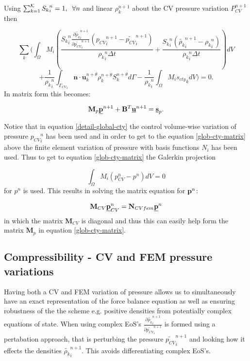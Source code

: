 Using $\sum_{k=1}^{\cal K} {S_k}_i^n =1, \;\; \forall n$ and linear 
$\rho_k^{n+1}$ about the CV pressure variation $P_{CV}^{n+1}$ then 

\begin{equation}
 \sum_k ( \int_{\Omega} M_i 
( \frac{{S_k}_i^n \frac{\partial \tilde{\rho_k}_i^{n+1}}{\partial \tilde{ p_{CV}}_i^{n+1}}({p_{CV}}_i^{n+1}-\tilde{p_{CV}}_i^{n+1})
} {{\rho_k}_i^n\Delta t} 
+ \frac{{S_k}_i^n( \tilde{\rho_k}_i^{n+1}-{\rho_k}_i^n)} 
{{\rho_k}_i^n \Delta t} ) dV
\end{equation}
\begin{equation}
+ \frac{1}{{\rho_k}_i^n}\int_{{\Gamma_{CV}}_i} {\mathbf n} \cdot {\mathbf u}_k^{n+\theta} \rho_k^{n+\theta} S_k^{n+\theta} d\Gamma
- \frac{1}{{\rho_k}_i^n} \int_\Omega M_i {s_{cty}}_k dV ) =0.
\label{detail-global-cty}
\end{equation}
In matrix form this becomes:

\begin{equation}
{\mathbf M}_p \underline{\bf p}^{n+1} + {\mathbf B}^T \underline{\bf u}^{n+1} 
= \underline{\bf s}_p. 
\label{glob-cty-matrix}
\end{equation}

Notice that in equation \ref{detail-global-cty} the 
control volume-wise variation of pressure ${p_{CV}}_i^n$ has been 
used and in order to get to the equation  \ref{glob-cty-matrix} 
above the finite element variation of pressure with basis 
functions $N_i$ has been used. Thus to get to equation 
\ref{glob-cty-matrix} the Galerkin projection

\begin{equation}
\int_{\Omega} M_i (p_{CV}^n-p^n) dV =0
\end{equation}
for $p^n$ is used. This results in solving the matrix 
equation for ${\bf p}^n$: 

\begin{equation}
{\mathbf M}_{CV} \underline{\bf p}_{CV}^n = {\mathbf N}_{CVfem} \underline {\bf p}^n
\end{equation}
in which the matrix ${\mathbf M}_{CV}$ is diagonal and thus 
this can easily help form the matrix ${\mathbf M}_p$ in equation 
\ref{glob-cty-matrix}. 

\subsection{Compressibility - CV and FEM pressure variations}

Having both a CV and FEM variation of pressure allows us to 
simultaneously have an exact representation of the force balance 
equation as well as ensuring robustness of the the scheme 
e.g. positive densities from potentially complex equations 
of state. When using complex EoS's $\frac{\partial \tilde { \rho_k}_i^{n+1}}{\partial \tilde {p_{CV}}_i^{n+1}}$ is formed 
using a pertabation approach, that is 
perturbing the pressure $\tilde {p_{CV}}_i^{n+1}$ and looking how 
it effects the densities $\tilde {\rho_k}_i^{n+1}$. This 
avoids differentiating complex EoS's. 


